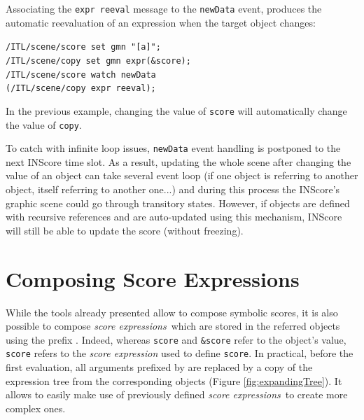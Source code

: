 \documentclass{article}
\newcommand{\OSC}[1]{\texttt{#1}}
\newcommand{\param}[1]{\textcolor{figOrange}{#1}}
\newcommand{\prefix}[1]{\textcolor{figBlue}{#1}}
\newcommand{\sExpr}{\emph{score expressions}}
\newcommand{\lowTilde}{\texttildelow}
\newcommand{\sample}	[1]			{\vspace{-0.2em}\begin{center}\colorbox{mygrey}{\begin{minipage}[t]{0.95\columnwidth} {\small \texttt{#1}}\end{minipage}}\end{center}}
\begin{document}
Associating the \OSC{expr reeval} message to the \OSC{newData} event, produces the automatic reevaluation of an expression when the target object changes:
\sample{/ITL/scene/score set gmn "[a]";\\
/ITL/scene/copy set gmn expr(\&score);\\
/ITL/scene/score watch newData\\   
\hspace*{8mm}(/ITL/scene/copy expr reeval);
}
In the previous example, changing the value of \OSC{score} will automatically change the value of \OSC{copy}.

To catch with infinite loop issues, \OSC{newData} event handling is postponed to the next INScore time slot. As a result, updating the whole scene after changing the value of an object can take several event loop (if one object is referring to another object, itself referring to another one...) and during this process the INScore's graphic scene could go through transitory states. However, if objects are defined with recursive references and are auto-updated using this mechanism, INScore will still be able to update the score (without freezing).

\section{Composing Score Expressions}
\label{composingExpr}
 While the tools already presented allow to compose symbolic scores, it is also possible to compose \sExpr\ which are stored in the referred objects using the prefix \OSC{\prefix{\lowTilde}}. Indeed, whereas \OSC{\param{score}} and \OSC{\prefix{\&}\param{score}} refer to the object's value, \OSC{\prefix{\lowTilde}\param{score}} refers to the \emph{score expression} used to define \OSC{score}. In practical, before the first evaluation, all arguments prefixed by \OSC{\prefix{\lowTilde}} are replaced by a copy of the expression tree from the corresponding objects (Figure \ref{fig:expandingTree}).
It allows to easily make use of previously defined \sExpr\ to create more complex ones.
\end{document}
